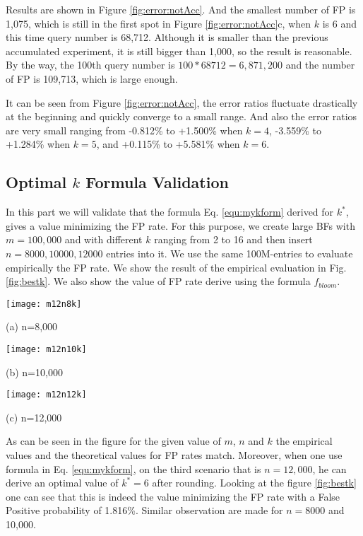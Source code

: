  Results are shown in Figure \ref{fig:error:notAcc}. And the smallest number of FP is 1,075, which is still in the first spot in Figure \ref{fig:error:notAcc}c, when $k$ is 6 and this time query number is 68,712. Although it is smaller than the previous accumulated experiment, it is still bigger than 1,000, so the result is reasonable. By the way, the 100th query number is $100*68712=6,871,200$ and the number of FP is 109,713, which is large enough.

 It can be seen from Figure \ref{fig:error:notAcc}, the error ratios fluctuate drastically at the beginning and quickly converge to a small range. And also the error ratios are very small ranging from -0.812\% to +1.500\% when $k=4$, -3.559\% to +1.284\% when $k=5$, and +0.115\% to +5.581\% when $k=6$.


\subsection{Optimal $k$ Formula Validation}

In this  part we will validate that the formula Eq. \ref{equ:mykform} derived for $k^*$, gives a value minimizing the FP rate. For this purpose, we create large BFs with $m=100,000$ and with different $k$ ranging from 2 to 16  and then insert $n=8000,10000, 12000$ entries into it. We use the same 100M-entries to evaluate empirically the FP rate. We show the result of the empirical evaluation in Fig.\ref{fig:bestk}. We also show the value of FP rate derive using the formula $f_{bloom}$.
\begin{figure*}[htbp]
	\begin{minipage}{0.32\linewidth}
		\centerline{\texttt{[image: m12n8k]}}
		\centerline{(a) n=8,000}
	\end{minipage}
	\hfill
	\begin{minipage}{0.32\linewidth}
		\centerline{\texttt{[image: m12n10k]}}
		\centerline{(b) n=10,000}
	\end{minipage}
	\hfill
	\begin{minipage}{0.32\linewidth}
		\centerline{\texttt{[image: m12n12k]}}
		\centerline{(c) n=12,000}
	\end{minipage}
	\caption{Variation of FP rate as a function of the number of hash functions $k$ for $m=100,000$ and different number of inserted entries $n$}
	\label{fig:bestk}
\end{figure*}
As can be seen in the figure for the given value of $m$, $n$ and $k$ the empirical values and the theoretical values for FP rates match. Moreover, when one use formula in Eq. \ref{equ:mykform}, on the third scenario that is $n=12,000$, he can derive an optimal value of $k^*=6$ after rounding. Looking at the figure \ref{fig:bestk} one can see that this is indeed the value minimizing the FP rate with a False Positive probability of 1.816\%. Similar observation are made for $n=8000$ and 10,000.

